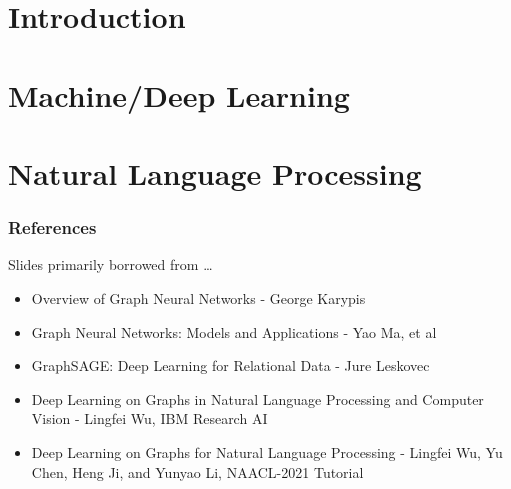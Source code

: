 \section[Intro]{Introduction}


\section[MLDL]{Machine/Deep Learning}


\section[NLP]{Natural Language Processing}


\begin{frame}[fragile]\frametitle{References}
Slides primarily borrowed from \ldots

\begin{itemize}
\item Overview of Graph Neural Networks - George Karypis
\item Graph Neural Networks: Models and Applications - Yao Ma, et al
\item GraphSAGE: Deep Learning for Relational Data - Jure Leskovec
\item Deep Learning on Graphs in Natural Language Processing and Computer Vision - Lingfei Wu, IBM Research AI
\item Deep Learning on Graphs for Natural Language Processing - Lingfei Wu, Yu Chen, Heng Ji, and Yunyao Li, NAACL-2021 Tutorial

\end{itemize}

\end{frame}
